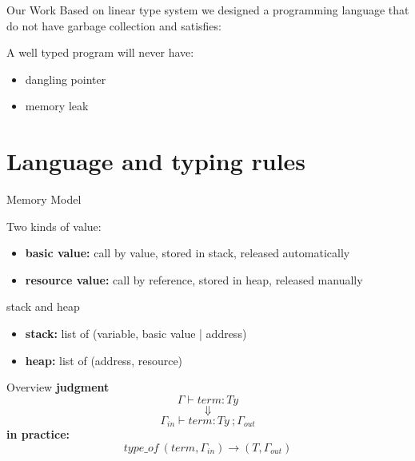 \documentclass[10pt]{beamer}
\begin{document}
\begin{frame}[fragile]{Our Work}
	Based on linear type system we designed a programming language that do not have garbage collection and satisfies:
	\begin{block}{A well typed program will never have:}
		\begin{itemize}
			\item dangling pointer
			\item memory leak
		\end{itemize}
	\end{block}
\end{frame}


\section{Language and typing rules}


\begin{frame}[fragile]{Memory Model}
	\begin{block}{Two kinds of value:}
		\begin{itemize}
			\item \textbf{basic value:} call by value, stored in stack, released automatically
			\item \textbf{resource value:} call by reference, stored in heap, released manually
		\end{itemize}
	\end{block}
	
	\begin{block}{stack and heap}
		\begin{itemize}
			\item \textbf{stack:} list of (variable,  basic value | address)
			\item \textbf{heap:} list of (address, resource) 
		\end{itemize}	
	\end{block}

\end{frame}


\begin{frame}[fragile]{Overview}
	\textbf{judgment}
		\[
			\Gamma \vdash term : Ty
		\]
		\[
			\Downarrow
		\]
		\[
			\Gamma_{in} \vdash term : Ty\ ;\Gamma_{out}
		\]
\textbf{in practice:}		
		\[
			type\_of\ (term,\Gamma_{in}) \rightarrow (T,\Gamma_{out})
		\]
\end{frame}
\end{document}
